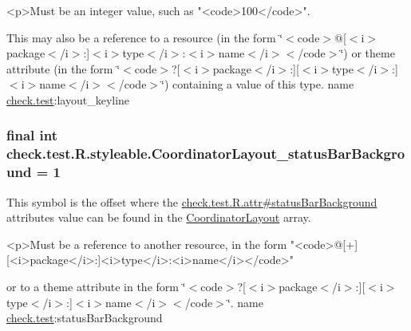 \begin{DoxyVerb}      <p>Must be an integer value, such as "<code>100</code>".
\end{DoxyVerb}
 

This may also be a reference to a resource (in the form \char`\"{}$<$code$>$@\mbox{[}$<$i$>$package$<$/i$>$\+:\mbox{]}$<$i$>$type$<$/i$>$\+:$<$i$>$name$<$/i$>$$<$/code$>$\char`\"{}) or theme attribute (in the form \char`\"{}$<$code$>$?\mbox{[}$<$i$>$package$<$/i$>$\+:\mbox{]}\mbox{[}$<$i$>$type$<$/i$>$\+:\mbox{]}$<$i$>$name$<$/i$>$$<$/code$>$\char`\"{}) containing a value of this type.  name \hyperlink{namespacecheck_1_1test}{check.\+test}\+:layout\+\_\+keyline \hypertarget{classcheck_1_1test_1_1_r_1_1styleable_ad1fdf005500041f1c7352b0934313c58}{}
\subsubsection[{Coordinator\+Layout\+\_\+status\+Bar\+Background}]{\setlength{\rightskip}{0pt plus 5cm}final int check.\+test.\+R.\+styleable.\+Coordinator\+Layout\+\_\+status\+Bar\+Background = 1\hspace{0.3cm}{\ttfamily [static]}}\label{classcheck_1_1test_1_1_r_1_1styleable_ad1fdf005500041f1c7352b0934313c58}
This symbol is the offset where the \hyperlink{classcheck_1_1test_1_1_r_1_1attr_a2dad671700479c49f02a7617b4b41b9b}{check.\+test.\+R.\+attr\#status\+Bar\+Background} attribute\textquotesingle{}s value can be found in the \hyperlink{classcheck_1_1test_1_1_r_1_1styleable_af5f8b747fab6f8b93989f42f927f00fc}{Coordinator\+Layout} array.

\begin{DoxyVerb}      <p>Must be a reference to another resource, in the form "<code>@[+][<i>package</i>:]<i>type</i>:<i>name</i></code>"
\end{DoxyVerb}
 or to a theme attribute in the form \char`\"{}$<$code$>$?\mbox{[}$<$i$>$package$<$/i$>$\+:\mbox{]}\mbox{[}$<$i$>$type$<$/i$>$\+:\mbox{]}$<$i$>$name$<$/i$>$$<$/code$>$\char`\"{}.  name \hyperlink{namespacecheck_1_1test}{check.\+test}\+:status\+Bar\+Background \hypertarget{classcheck_1_1test_1_1_r_1_1styleable_a3bd2348d01049d5d42d5b7f277abeec9}{}
